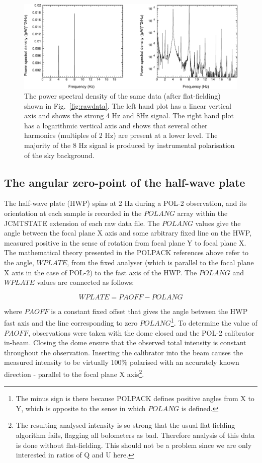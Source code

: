 \documentclass[twoside,11pt]{starlink}
\begin{document}
\begin{figure}
\includegraphics[width=\columnwidth]{rawfft}
\caption{The power spectral density of the same data (after
flat-fielding) shown in Fig.~\ref{fig:rawdata}. The left hand plot has a
linear vertical axis and shows the strong 4 Hz and 8Hz signal. The right
hand plot has a logarithmic vertical axis and shows that several other
harmonics (multiples of 2 Hz) are present at a lower level. The majority
of the 8 Hz signal is produced by instrumental polarisation of the sky
background.}
\label{fig:rawfft}
\end{figure}


\subsection{The angular zero-point of the half-wave plate}
\label{sec:rawcal}
The half-wave plate (HWP) spins at 2 Hz during a POL-2 observation, and
its orientation at each sample is recorded in the $POLANG$ array within
the JCMTSTATE extension of each raw data file. The $POLANG$ values give
the angle between the focal plane X axis and some arbitrary fixed line on
the HWP, measured positive in the sense of rotation from focal plane Y to
focal plane X. The mathematical theory presented in the POLPACK
references above refer to the angle, $WPLATE$, from the fixed analyser
(which is parallel to the focal plane X axis in the case of POL-2) to the
fast axis of the HWP. The $POLANG$ and $WPLATE$ values are connected as
follows:

\[ WPLATE = PAOFF - POLANG \]

where $PAOFF$ is a constant fixed offset that gives the angle between the
HWP fast axis and the line corresponding to zero $POLANG$\footnote{The
minus sign is there because POLPACK defines positive angles from X to Y,
which is opposite to the sense in which $POLANG$ is defined.}. To
determine the value of $PAOFF$, observations were taken with the dome
closed and the POL-2 calibrator in-beam. Closing the dome ensure that the
observed total intensity is constant throughout the observation.
Inserting the calibrator into the beam causes the measured intensity to
be virtually 100\% polarised with an accurately known direction - parallel
to the focal plane X axis\footnote{The resulting analysed intensity is
so strong that the usual flat-fielding algorithm fails, flagging all
bolometers as bad. Therefore analysis of this data is done without
flat-fielding. This should not be a problem since we are only interested
in ratios of Q and U here.}.
\end{document}
